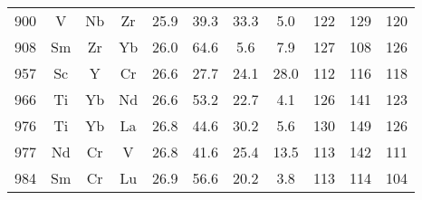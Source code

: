 \begin{center}
\begin{xtabular}{c|ccc|cccc|ccc}
 900 &  V &  Nb &  Zr & 25.9 & 39.3 & 33.3 & 5.0 & 122 & 129 & 120 \\
 908 &  Sm &  Zr &  Yb & 26.0 & 64.6 & 5.6 & 7.9 & 127 & 108 & 126 \\
 957 &  Sc &  Y &  Cr & 26.6 & 27.7 & 24.1 & 28.0 & 112 & 116 & 118 \\
 966 &  Ti &  Yb &  Nd & 26.6 & 53.2 & 22.7 & 4.1 & 126 & 141 & 123 \\
 976 &  Ti &  Yb &  La & 26.8 & 44.6 & 30.2 & 5.6 & 130 & 149 & 126 \\
 977 &  Nd &  Cr &  V & 26.8 & 41.6 & 25.4 & 13.5 & 113 & 142 & 111 \\
 984 &  Sm &  Cr &  Lu & 26.9 & 56.6 & 20.2 & 3.8 & 113 & 114 & 104 \\
\end{xtabular}
\end{center}

\clearpage

